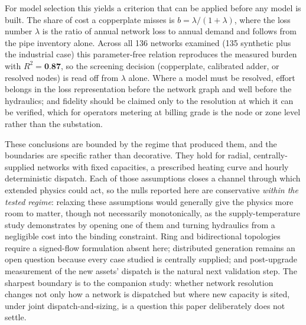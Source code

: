 For model selection this yields a criterion that can be applied before any model is built.
The share of cost a copperplate misses is $b = \lambda/(1+\lambda)$, where the loss number
$\lambda$ is the ratio of annual network loss to annual demand and follows from the pipe
inventory alone. Across all 136 networks examined (135 synthetic plus the industrial case)
this parameter-free relation reproduces the measured burden with $R^2 = \textbf{0.87}$, so the
screening decision (copperplate, calibrated adder, or resolved nodes) is read off from
$\lambda$ alone. Where a model must be resolved, effort belongs in the loss representation
before the network graph and well before the hydraulics; and fidelity should be claimed only to
the resolution at which it can be verified, which for operators metering at billing grade is
the node or zone level rather than the substation.

These conclusions are bounded by the regime that produced them, and the boundaries are
specific rather than decorative. They hold for radial, centrally-supplied networks with
fixed capacities, a prescribed heating curve and hourly deterministic dispatch. Each of
those assumptions closes a channel through which extended physics could act, so the nulls
reported here are conservative \emph{within the tested regime}: relaxing these assumptions would
generally give the physics more room to matter, though not necessarily monotonically, as the
supply-temperature study demonstrates by opening one of
them and turning hydraulics from a negligible cost into the binding constraint. Ring and
bidirectional topologies require a signed-flow formulation absent here; distributed
generation remains an open question because every case studied is centrally supplied; and
post-upgrade measurement of the new assets' dispatch is the natural next validation step.
The sharpest boundary is to the companion study: whether network resolution changes not only
how a network is dispatched but where new capacity is sited, under joint
dispatch-and-sizing, is a question this paper deliberately does not settle.
